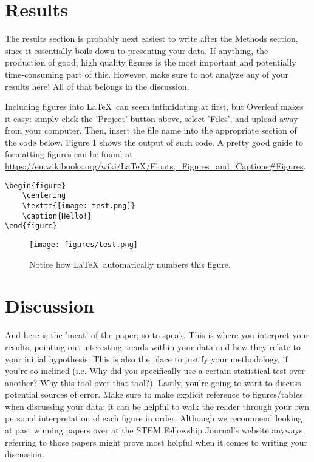 \documentclass[10pt,twocolumn,letterpaper]{article}
\begin{document}
\section{Results}

The results section is probably next easiest to write after the Methods section, since it essentially boils down to presenting your data. If anything, the production of good, high quality figures is the most important and potentially time-consuming part of this. However, make sure to not analyze any of your results here! All of that belongs in the discussion.

Including figures into \LaTeX\ can seem intimidating at first, but Overleaf makes it easy: simply click the 'Project' button above, select 'Files', and upload away from your computer. Then, insert the file name into the appropriate section of the code below.  Figure 1  shows the output of such code. A pretty good guide to formatting figures can be found at \url{https://en.wikibooks.org/wiki/LaTeX/Floats,_Figures_and_Captions#Figures}.
\\

{\scriptsize
\begin{verbatim}
\begin{figure}
    \centering
    \texttt{[image: test.png]}
    \caption{Hello!}
\end{figure}
\end{verbatim}
}

\begin{figure}
  \centering
  \texttt{[image: figures/test.png]}
  \caption{Notice how \LaTeX\ automatically numbers this figure.}
\end{figure}


\section{Discussion}
And here is the 'meat' of the paper, so to speak. This is where you interpret your results, pointing out interesting trends within your data and how they relate to your initial hypothesis. This is also the place to justify your methodology, if you're so inclined (i.e. Why did you specifically use a certain statistical test over another? Why this tool over that tool?). Lastly, you're going to want to discuss potential sources of error. Make sure to make explicit reference to figures/tables when discussing your data; it can be helpful to walk the reader through your own personal interpretation of each figure in order. Although we recommend looking at past winning papers over at the STEM Fellowship Journal's website anyways, referring to those papers might prove most helpful when it comes to writing your discussion.
\end{document}
